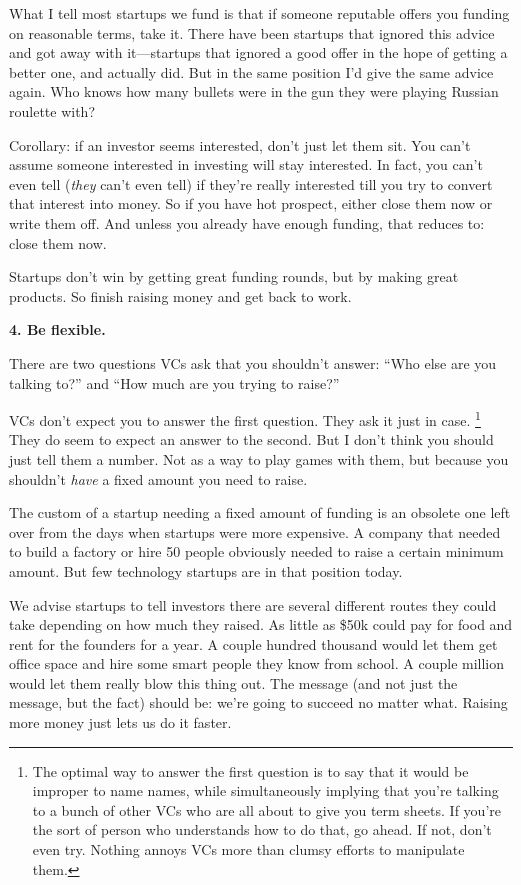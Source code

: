 What I tell most startups we fund is that if someone reputable offers
you funding on reasonable terms, take it. There have been startups that
ignored this advice and got away with it---startups that ignored a good
offer in the hope of getting a better one, and actually did. But in the
same position I'd give the same advice again. Who knows how many bullets
were in the gun they were playing Russian roulette with?

Corollary: if an investor seems interested, don't just let them sit. You
can't assume someone interested in investing will stay interested. In
fact, you can't even tell (\emph{they} can't even tell) if they're
really interested till you try to convert that interest into money. So
if you have hot prospect, either close them now or write them off. And
unless you already have enough funding, that reduces to: close them now.

Startups don't win by getting great funding rounds, but by making great
products. So finish raising money and get back to work.

\textbf{4. Be flexible.}

There are two questions VCs ask that you shouldn't answer: ``Who else
are you talking to?'' and ``How much are you trying to raise?''

VCs don't expect you to answer the first question. They ask it just in
case. \footnote{The optimal way to answer the first question is to say that it
would be improper to name names, while simultaneously implying that
you're talking to a bunch of other VCs who are all about to give you
term sheets. If you're the sort of person who understands how to do
that, go ahead. If not, don't even try. Nothing annoys VCs more than
clumsy efforts to manipulate them.} They do seem to expect an answer to the
second. But I don't think you should just tell them a number. Not as a
way to play games with them, but because you shouldn't \emph{have} a
fixed amount you need to raise.

The custom of a startup needing a fixed amount of funding is an obsolete
one left over from the days when startups were more expensive. A company
that needed to build a factory or hire 50 people obviously needed to
raise a certain minimum amount. But few technology startups are in that
position today.

We advise startups to tell investors there are several different routes
they could take depending on how much they raised. As little as \$50k
could pay for food and rent for the founders for a year. A couple
hundred thousand would let them get office space and hire some smart
people they know from school. A couple million would let them really
blow this thing out. The message (and not just the message, but the
fact) should be: we're going to succeed no matter what. Raising more
money just lets us do it faster.

